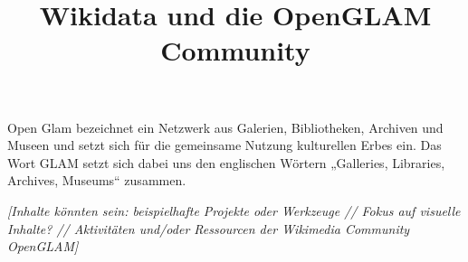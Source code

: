 \documentclass{article}
\begin{document}
\title{Wikidata und die OpenGLAM Community}

\maketitle





Open Glam bezeichnet ein Netzwerk aus Galerien, Bibliotheken, Archiven und Museen und setzt sich für die gemeinsame Nutzung kulturellen Erbes ein. Das Wort GLAM setzt sich dabei uns den englischen Wörtern „Galleries, Libraries, Archives, Museums“ zusammen. \autocite{FidusWriter}


\emph{[Inhalte könnten sein: beispielhafte Projekte oder Werkzeuge // Fokus auf visuelle Inhalte? // Aktivitäten und/oder Ressourcen der Wikimedia Community OpenGLAM]}


\printbibliography[title={Literaturverzeichnis}]
\end{document}
